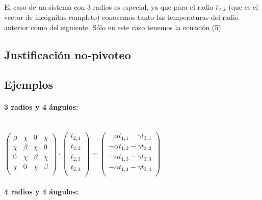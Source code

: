 \documentclass[12pt]{article}
\newcommand{\Gpmatrix}[1]{\ensuremath{\begin{pmatrix} #1 \end{pmatrix}}}
\newcommand{\sub}[3]{\ensuremath{#1_{#2,#3}}}
\begin{document}
\paragraph{} El caso de un sistema con 3 radios es especial, ya que para el radio \(\sub{t}{2}{k}\) (que es el vector de incógnitas completo) conocemos tanto las temperaturas del radio anterior como del siguiente. Sólo en este caso tenemos la ecuación (5).

\subsection{Justificación no-pivoteo} 

\subsection{Ejemplos}

\paragraph{3 radios y 4 ángulos:} \ \\

\(
\Gpmatrix{
  \beta & \chi & 0 & \chi \\
  \chi & \beta & \chi & 0 \\
  0 & \chi & \beta & \chi \\
  \chi & 0 & \chi & \beta \\
} \cdot \Gpmatrix{
  \sub{t}{2}{1} \\
  \sub{t}{2}{2} \\
  \sub{t}{2}{3} \\
  \sub{t}{2}{4} \\
} = \Gpmatrix{
  -\alpha\sub{t}{1}{1} - \gamma\sub{t}{3}{1} \\
  -\alpha\sub{t}{1}{2} - \gamma\sub{t}{3}{2} \\
  -\alpha\sub{t}{1}{3} - \gamma\sub{t}{3}{3} \\
  -\alpha\sub{t}{1}{4} - \gamma\sub{t}{3}{4} \\
}
\)

\paragraph{4 radios y 4 ángulos:} \ \\
\end{document}
